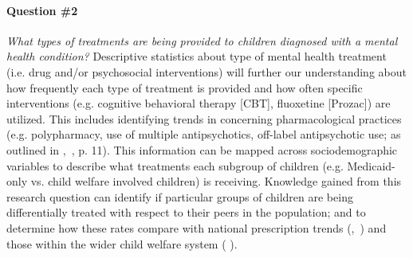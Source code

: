 \documentclass[twocolumn, serif, rga, authordate]{jote-article}
\begin{document}
\paragraph{Question \#2} \emph{What types of treatments are being provided
to children diagnosed with a mental health condition?} Descriptive
statistics about type of mental health treatment (i.e. drug and/or
psychosocial interventions) will further our understanding about how
frequently each type of treatment is provided and how often specific
interventions (e.g. cognitive behavioral therapy {[}CBT{]}, fluoxetine
{[}Prozac{]}) are utilized. This includes identifying trends in
concerning pharmacological practices (e.g. polypharmacy, use of multiple
antipsychotics, off-label antipsychotic use; as outlined in ,~\citeyear{GovernmentAccountabilityOffice2012}, p. 11). This information can be mapped
across sociodemographic variables to describe what treatments each
subgroup of children (e.g. Medicaid-only vs. child welfare involved
children) is receiving. Knowledge gained from this research question can
identify if particular groups of children are being differentially
treated with respect to their peers in the population; and to determine
how these rates compare with national prescription trends (,~\citeyear{Olfson2002}) and those within the wider child
welfare system ( \citeyear{Raghavan2005}).
\end{document}
